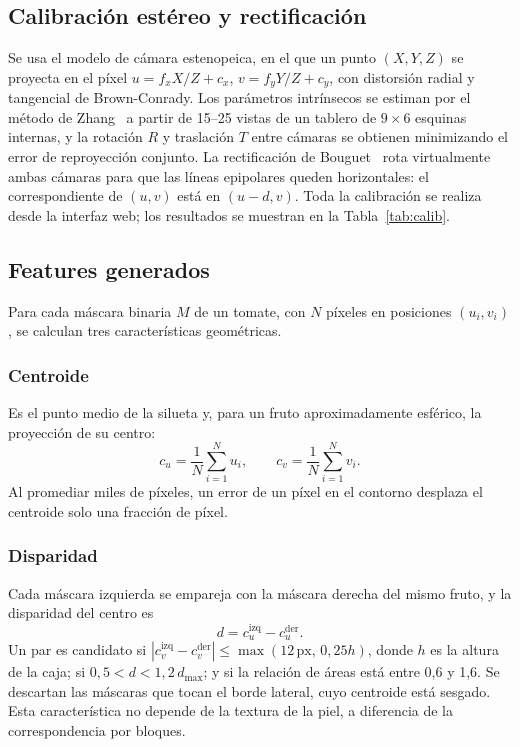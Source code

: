 \documentclass[conference]{IEEEtran}
\newcommand{\cizq}{c_u^{\mathrm{izq}}}
\newcommand{\cder}{c_u^{\mathrm{der}}}
\begin{document}
\subsection{Calibración estéreo y rectificación}
Se usa el modelo de cámara estenopeica, en el que un punto $(X,Y,Z)$ se proyecta en el píxel $u=f_xX/Z+c_x$, $v=f_yY/Z+c_y$, con distorsión radial y tangencial de Brown-Conrady. Los parámetros intrínsecos se estiman por el método de Zhang~\cite{zhang2000} a partir de 15--25 vistas de un tablero de $9\times6$ esquinas internas, y la rotación $R$ y traslación $T$ entre cámaras se obtienen minimizando el error de reproyección conjunto. La rectificación de Bouguet~\cite{bradski2008} rota virtualmente ambas cámaras para que las líneas epipolares queden horizontales: el correspondiente de $(u,v)$ está en $(u-d,v)$. Toda la calibración se realiza desde la interfaz web; los resultados se muestran en la Tabla~\ref{tab:calib}.

\subsection{Features generados}
Para cada máscara binaria $M$ de un tomate, con $N$ píxeles en posiciones $(u_i,v_i)$, se calculan tres características geométricas.

\subsubsection{Centroide}
Es el punto medio de la silueta y, para un fruto aproximadamente esférico, la proyección de su centro:
\begin{equation}
c_u=\frac{1}{N}\sum_{i=1}^{N}u_i,\qquad c_v=\frac{1}{N}\sum_{i=1}^{N}v_i .
\end{equation}
Al promediar miles de píxeles, un error de un píxel en el contorno desplaza el centroide solo una fracción de píxel.

\subsubsection{Disparidad}
Cada máscara izquierda se empareja con la máscara derecha del mismo fruto, y la disparidad del centro es
\begin{equation}
d=\cizq-\cder .
\end{equation}
Un par es candidato si $|c_v^{\mathrm{izq}}-c_v^{\mathrm{der}}|\le\max(12\,\mathrm{px},\,0{,}25h)$, donde $h$ es la altura de la caja; si $0{,}5<d<1{,}2\,d_{\max}$; y si la relación de áreas está entre 0,6 y 1,6. Se descartan las máscaras que tocan el borde lateral, cuyo centroide está sesgado. Esta característica no depende de la textura de la piel, a diferencia de la correspondencia por bloques.
\end{document}
